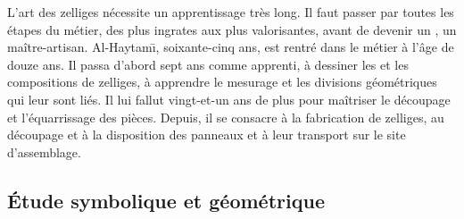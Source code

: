 L'art des zelliges nécessite un apprentissage très long. Il faut 
passer par toutes les étapes du métier, des plus ingrates aux plus 
valorisantes, avant de devenir un \maallem, un maître-artisan. 
Al-Haytam\={\i}, soixante-cinq ans, est rentré dans le métier à 
l'âge de douze ans. Il passa d'abord sept ans comme apprenti, à 
dessiner les \furmas et les compositions de zelliges, à apprendre 
le mesurage et les divisions géométriques qui leur sont liés. Il 
lui fallut vingt-et-un ans de plus pour maîtriser le découpage et 
l'équarrissage des pièces. Depuis, il se consacre à la fabrication 
de zelliges, au découpage et à la disposition des panneaux et à leur 
transport sur le site d'assemblage.

\subsection{Étude symbolique et géométrique}

